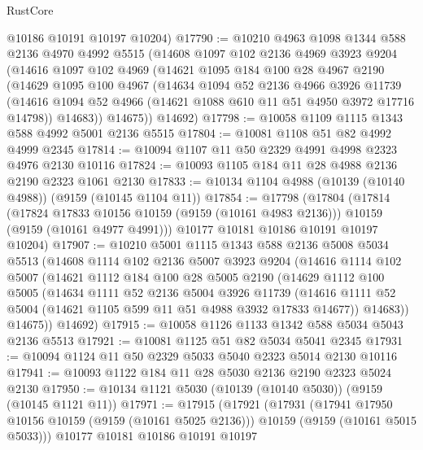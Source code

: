 \begin{lexlean}{RustCore}
\begin{coremodule}
      @10186
      @10191
      @10197
      @10204)
@17790 := @10210
    @4963
    @1098
    @1344
    @588
    @2136
    @4970
    @4992
    @5515
    (@14608
      @1097
      @102
      @2136
      @4969
      @3923
      @9204
      (@14616
        @1097
        @102
        @4969
        (@14621
          @1095
          @184
          @100
          @28
          @4967
          @2190
          (@14629
            @1095
            @100
            @4967
            (@14634
              @1094
              @52
              @2136
              @4966
              @3926
              @11739
              (@14616 @1094 @52 @4966 (@14621 @1088 @610 @11 @51 @4950 @3972 @17716 @14798))
              @14683))
          @14675))
      @14692)
@17798 := @10058 @1109 @1115 @1343 @588 @4992 @5001 @2136 @5515
@17804 := @10081 @1108 @51 @82 @4992 @4999 @2345
@17814 := @10094 @1107 @11 @50 @2329 @4991 @4998 @2323 @4976 @2130 @10116
@17824 := @10093 @1105 @184 @11 @28 @4988 @2136 @2190 @2323 @1061 @2130
@17833 := @10134 @1104 @4988 (@10139 (@10140 @4988)) (@9159 (@10145 @1104 @11))
@17854 := @17798
    (@17804
      (@17814
        (@17824 @17833 @10156 @10159 (@9159 (@10161 @4983 @2136)))
        @10159
        (@9159 (@10161 @4977 @4991)))
      @10177
      @10181
      @10186
      @10191
      @10197
      @10204)
@17907 := @10210
    @5001
    @1115
    @1343
    @588
    @2136
    @5008
    @5034
    @5513
    (@14608
      @1114
      @102
      @2136
      @5007
      @3923
      @9204
      (@14616
        @1114
        @102
        @5007
        (@14621
          @1112
          @184
          @100
          @28
          @5005
          @2190
          (@14629
            @1112
            @100
            @5005
            (@14634
              @1111
              @52
              @2136
              @5004
              @3926
              @11739
              (@14616 @1111 @52 @5004 (@14621 @1105 @599 @11 @51 @4988 @3932 @17833 @14677))
              @14683))
          @14675))
      @14692)
@17915 := @10058 @1126 @1133 @1342 @588 @5034 @5043 @2136 @5513
@17921 := @10081 @1125 @51 @82 @5034 @5041 @2345
@17931 := @10094 @1124 @11 @50 @2329 @5033 @5040 @2323 @5014 @2130 @10116
@17941 := @10093 @1122 @184 @11 @28 @5030 @2136 @2190 @2323 @5024 @2130
@17950 := @10134 @1121 @5030 (@10139 (@10140 @5030)) (@9159 (@10145 @1121 @11))
@17971 := @17915
    (@17921
      (@17931
        (@17941 @17950 @10156 @10159 (@9159 (@10161 @5025 @2136)))
        @10159
        (@9159 (@10161 @5015 @5033)))
      @10177
      @10181
      @10186
      @10191
      @10197

\end{coremodule}
\end{lexlean}
